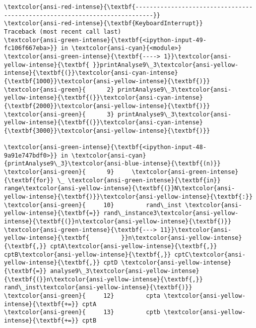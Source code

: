 \documentclass[11pt]{article}
\begin{document}
    \begin{Verbatim}[commandchars=\\\{\}, frame=single, framerule=2mm, rulecolor=\color{outerrorbackground}]
\textcolor{ansi-red-intense}{\textbf{---------------------------------------------------------------------------}}
\textcolor{ansi-red-intense}{\textbf{KeyboardInterrupt}}                         Traceback (most recent call last)
\textcolor{ansi-green-intense}{\textbf{<ipython-input-49-fc106f667eba>}} in \textcolor{ansi-cyan}{<module>}
\textcolor{ansi-green-intense}{\textbf{----> 1}}\textcolor{ansi-yellow-intense}{\textbf{ }}printAnalyse9\_3\textcolor{ansi-yellow-intense}{\textbf{(}}\textcolor{ansi-cyan-intense}{\textbf{1000}}\textcolor{ansi-yellow-intense}{\textbf{)}}
\textcolor{ansi-green}{      2} printAnalyse9\_3\textcolor{ansi-yellow-intense}{\textbf{(}}\textcolor{ansi-cyan-intense}{\textbf{2000}}\textcolor{ansi-yellow-intense}{\textbf{)}}
\textcolor{ansi-green}{      3} printAnalyse9\_3\textcolor{ansi-yellow-intense}{\textbf{(}}\textcolor{ansi-cyan-intense}{\textbf{3000}}\textcolor{ansi-yellow-intense}{\textbf{)}}

\textcolor{ansi-green-intense}{\textbf{<ipython-input-48-9a91e747bdf0>}} in \textcolor{ansi-cyan}{printAnalyse9\_3}\textcolor{ansi-blue-intense}{\textbf{(n)}}
\textcolor{ansi-green}{      9}     \textcolor{ansi-green-intense}{\textbf{for}} \_ \textcolor{ansi-green-intense}{\textbf{in}} range\textcolor{ansi-yellow-intense}{\textbf{(}}N\textcolor{ansi-yellow-intense}{\textbf{)}}\textcolor{ansi-yellow-intense}{\textbf{:}}
\textcolor{ansi-green}{     10}         rand\_inst \textcolor{ansi-yellow-intense}{\textbf{=}} rand\_instance3\textcolor{ansi-yellow-intense}{\textbf{(}}n\textcolor{ansi-yellow-intense}{\textbf{)}}
\textcolor{ansi-green-intense}{\textbf{---> 11}}\textcolor{ansi-yellow-intense}{\textbf{         }}n\textcolor{ansi-yellow-intense}{\textbf{,}} cptA\textcolor{ansi-yellow-intense}{\textbf{,}} cptB\textcolor{ansi-yellow-intense}{\textbf{,}} cptC\textcolor{ansi-yellow-intense}{\textbf{,}} cptD \textcolor{ansi-yellow-intense}{\textbf{=}} analyse9\_3\textcolor{ansi-yellow-intense}{\textbf{(}}n\textcolor{ansi-yellow-intense}{\textbf{,}} rand\_inst\textcolor{ansi-yellow-intense}{\textbf{)}}
\textcolor{ansi-green}{     12}         cpta \textcolor{ansi-yellow-intense}{\textbf{+=}} cptA
\textcolor{ansi-green}{     13}         cptb \textcolor{ansi-yellow-intense}{\textbf{+=}} cptB


\end{Verbatim}
\end{document}
